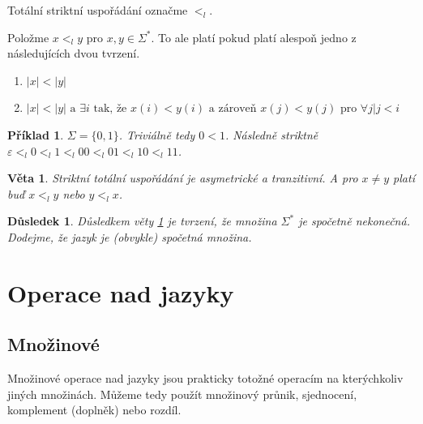 \documentclass[10pt, a4paper, titlepage]{article}
\theoremstyle{note}
\newtheorem{veta}{\textbf{Věta}}
\newtheorem{priklad}{\textbf{Příklad}}
\newtheorem{dusledek}{\textbf{Důsledek}}
\begin{document}
Totální striktní uspořádání označme $<_{l}$.

Položme $x <_{l} y$ pro $x,y \in \Sigma^{*}$. To ale platí pokud platí alespoň jedno z následujících dvou tvrzení.
\begin{enumerate}
\item
$|x| < |y|$

\item
$|x| < |y| \text{ a } \exists i \text{ tak, že } x(i) < y(i) \text{ a zároveň } x(j) < y(j) \text{ pro } \forall j |j < i$
\end{enumerate}

\begin{priklad}
$\Sigma = \lbrace 0, 1 \rbrace$. Triviálně tedy $0 < 1$.
Následně striktně $\varepsilon <_{l} 0 <_{l} 1 <_{l} 00 <_{l} 01 <_{l} 10 <_{l} 11$.
\end{priklad}

\begin{veta} \label{veta-1}
Striktní totální uspořádání je asymetrické a tranzitivní. A pro $x \neq y$ platí buď $x <_{l} y$ nebo $y <_{l} x$.
\end{veta}

\begin{dusledek}
Důsledkem věty \ref{veta-1} je tvrzení, že množina $\Sigma^{*}$ je spočetně nekonečná. Dodejme, že jazyk je (obvykle) spočetná množina.
\end{dusledek}

\section{Operace nad jazyky}
\subsection{Množinové}
Množinové operace nad jazyky jsou prakticky totožné operacím na kterýchkoliv jiných množinách. Můžeme tedy použít množinový průnik, sjednocení, komplement (doplněk) nebo rozdíl.
\end{document}
